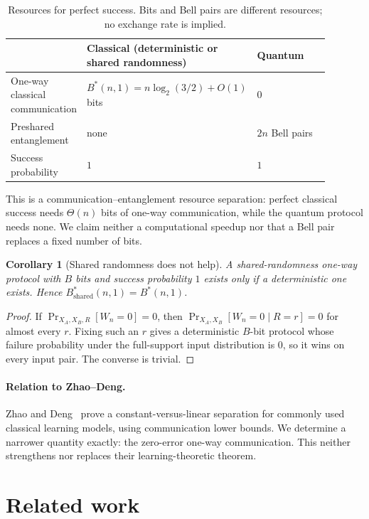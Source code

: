 \documentclass[12pt,a4paper]{article}
\newtheorem{corollary}[theorem]{Corollary}
\theoremstyle{definition}
\theoremstyle{remark}
\newcommand{\Bstar}{B^{*}}
\begin{document}
\begin{table}[H]
\centering
\caption{Resources for perfect success. Bits and Bell pairs are different resources; no exchange rate is implied.}
\label{tab:resource}
\begin{tabular}{p{0.23\linewidth}p{0.43\linewidth}p{0.23\linewidth}}
\toprule
 & Classical (deterministic or shared randomness) & Quantum~\cite{zhaodeng2025} \\
\midrule
One-way classical communication & $\Bstar(n,1)=n\log_2(3/2)+O(1)$ bits & $0$ \\
Preshared entanglement & none & $2n$ Bell pairs \\
Success probability & $1$ & $1$ \\
\bottomrule
\end{tabular}
\end{table}

This is a communication--entanglement resource separation: perfect classical success needs $\Theta(n)$ bits of one-way communication, while the quantum protocol needs none. We claim neither a computational speedup nor that a Bell pair replaces a fixed number of bits.

\begin{corollary}[Shared randomness does not help]
\label{cor:shared}
A shared-randomness one-way protocol with $B$ bits and success probability $1$ exists only if a deterministic one exists. Hence $\Bstar_{\mathrm{shared}}(n,1)=\Bstar(n,1)$.
\end{corollary}

\begin{proof}
If $\Pr_{X_A,X_B,R}[W_n=0]=0$, then $\Pr_{X_A,X_B}[W_n=0\mid R=r]=0$ for almost every $r$. Fixing such an $r$ gives a deterministic $B$-bit protocol whose failure probability under the full-support input distribution is $0$, so it wins on every input pair. The converse is trivial.
\end{proof}

\paragraph{Relation to Zhao--Deng.} Zhao and Deng~\cite{zhaodeng2025} prove a constant-versus-linear separation for commonly used classical learning models, using communication lower bounds. We determine a narrower quantity exactly: the zero-error one-way communication. This neither strengthens nor replaces their learning-theoretic theorem.

\section{Related work}
\label{sec:related}
\end{document}
